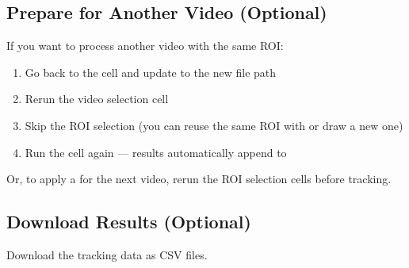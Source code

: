 \documentclass[letterpaper,10pt,english]{jupyterBook}
\begin{document}
\subsection{Prepare for Another Video (Optional)}
\label{\detokenize{FlyTracking/ColabNotebook:prepare-for-another-video-optional}}
\sphinxAtStartPar
If you want to process another video with the same ROI:
\begin{enumerate}
%
\item {} 
\sphinxAtStartPar
Go back to the  cell and update  to the new file path

\item {} 
\sphinxAtStartPar
Re\sphinxhyphen{}run the video selection cell

\item {} 
\sphinxAtStartPar
Skip the ROI selection (you can reuse the same ROI with  or draw a new one)

\item {} 
\sphinxAtStartPar
Run the  cell again — results automatically append to 

\end{enumerate}

\sphinxAtStartPar
Or, to apply a  for the next video, re\sphinxhyphen{}run the ROI selection cells before tracking.


\subsection{Download Results (Optional)}
\label{\detokenize{FlyTracking/ColabNotebook:download-results-optional}}
\sphinxAtStartPar
Download the tracking data as CSV files.
\end{document}
